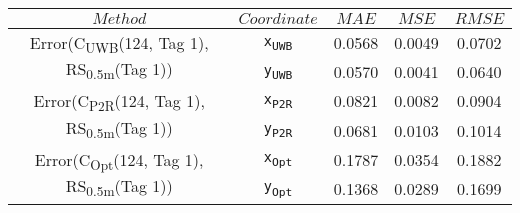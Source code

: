 \begin{table}[h]
\centering
\begin{tabular}{|c|c|c|c|c|}
\hline
$Method$ & $Coordinate$ & $MAE$ & $MSE$ & $RMSE$ \\
\hline
\multirow{2}{*}{{\footnotesize Error(C\textsubscript{UWB}(124, Tag 1), RS\textsubscript{0.5m}(Tag 1))}} & \texttt{x\textsubscript{UWB}} & 0.0568 & 0.0049 & 0.0702 \\
& \texttt{y\textsubscript{UWB}} & 0.0570 & 0.0041 & 0.0640 \\
\hline
\multirow{2}{*}{{\footnotesize Error(C\textsubscript{P2R}(124, Tag 1), RS\textsubscript{0.5m}(Tag 1))}} & \texttt{x\textsubscript{P2R}} & 0.0821 & 0.0082 & 0.0904 \\
& \texttt{y\textsubscript{P2R}} & 0.0681 & 0.0103 & 0.1014 \\
\hline
\multirow{2}{*}{{\footnotesize Error(C\textsubscript{Opt}(124, Tag 1), RS\textsubscript{0.5m}(Tag 1))}} & \texttt{x\textsubscript{Opt}} & 0.1787 & 0.0354 & 0.1882 \\
& \texttt{y\textsubscript{Opt}} & 0.1368 & 0.0289 & 0.1699 \\
\hline
\end{tabular}
\end{table}

